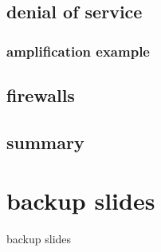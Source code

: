 \subsection{denial of service}


\subsubsection{amplification example}

\subsection{firewalls} %


\subsection{summary}


\section{backup slides}
\begin{frame}{backup slides}
\end{frame}
